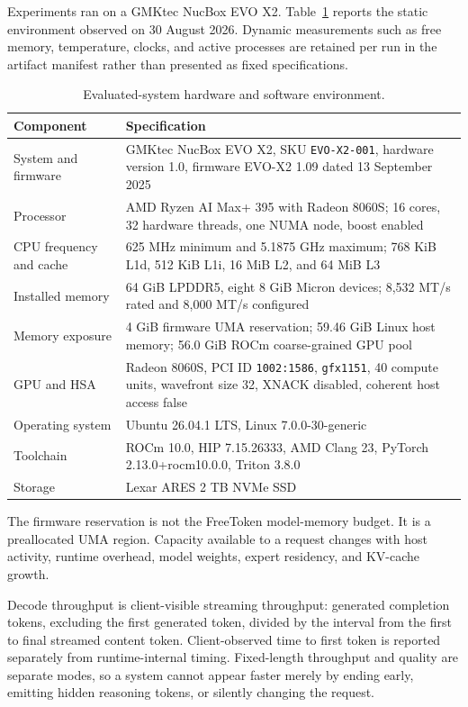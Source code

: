 \documentclass[10pt,letterpaper,twocolumn]{article}
\begin{document}
Experiments ran on a GMKtec NucBox EVO X2. Table~\ref{tab:platform} reports the static environment observed on 30 August 2026. Dynamic measurements such as free memory, temperature, clocks, and active processes are retained per run in the artifact manifest rather than presented as fixed specifications.

\begin{table}[t]
\caption{Evaluated-system hardware and software environment.}
\label{tab:platform}
\centering
\small
\begin{tabularx}{\textwidth}{>{\raggedright\arraybackslash}p{}X}
\toprule
Component & Specification \\
\midrule
System and firmware & GMKtec NucBox EVO X2, SKU \texttt{EVO-X2-001}, hardware version 1.0, firmware EVO-X2 1.09 dated 13 September 2025 \\
Processor & AMD Ryzen AI Max+ 395 with Radeon 8060S; 16 cores, 32 hardware threads, one NUMA node, boost enabled \\
CPU frequency and cache & 625 MHz minimum and 5.1875 GHz maximum; 768 KiB L1d, 512 KiB L1i, 16 MiB L2, and 64 MiB L3 \\
Installed memory & 64 GiB LPDDR5, eight 8 GiB Micron devices; 8,532 MT/s rated and 8,000 MT/s configured \\
Memory exposure & 4 GiB firmware UMA reservation; 59.46 GiB Linux host memory; 56.0 GiB ROCm coarse-grained GPU pool \\
GPU and HSA & Radeon 8060S, PCI ID \texttt{1002:1586}, \texttt{gfx1151}, 40 compute units, wavefront size 32, XNACK disabled, coherent host access false \\
Operating system & Ubuntu 26.04.1 LTS, Linux 7.0.0-30-generic \\
Toolchain & ROCm 10.0, HIP 7.15.26333, AMD Clang 23, PyTorch 2.13.0+rocm10.0.0, Triton 3.8.0 \\
Storage & Lexar ARES 2 TB NVMe SSD \\
\bottomrule
\end{tabularx}
\end{table}

The firmware reservation is not the FreeToken model-memory budget. It is a preallocated UMA region. Capacity available to a request changes with host activity, runtime overhead, model weights, expert residency, and KV-cache growth.

Decode throughput is client-visible streaming throughput: generated completion tokens, excluding the first generated token, divided by the interval from the first to final streamed content token. Client-observed time to first token is reported separately from runtime-internal timing. Fixed-length throughput and quality are separate modes, so a system cannot appear faster merely by ending early, emitting hidden reasoning tokens, or silently changing the request.
\end{document}
